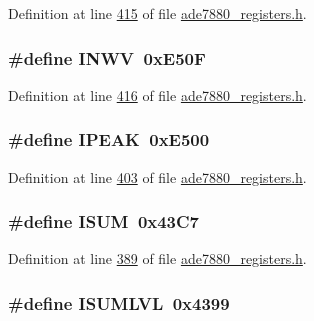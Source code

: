 Definition at line \hyperlink{a00036_source_l00415}{415} of file \hyperlink{a00036_source}{ade7880\-\_\-registers.\-h}.

\hypertarget{a00036_a55555ccc816198768fe973de5ca2b185}{
\subsubsection[{I\-N\-W\-V}]{\setlength{\rightskip}{0pt plus 5cm}\#define I\-N\-W\-V~0x\-E50\-F}}\label{de/d8c/a00036_a55555ccc816198768fe973de5ca2b185}


Definition at line \hyperlink{a00036_source_l00416}{416} of file \hyperlink{a00036_source}{ade7880\-\_\-registers.\-h}.

\hypertarget{a00036_a5ddcbc71d03e9945b4f454d59bb76140}{
\subsubsection[{I\-P\-E\-A\-K}]{\setlength{\rightskip}{0pt plus 5cm}\#define I\-P\-E\-A\-K~0x\-E500}}\label{de/d8c/a00036_a5ddcbc71d03e9945b4f454d59bb76140}


Definition at line \hyperlink{a00036_source_l00403}{403} of file \hyperlink{a00036_source}{ade7880\-\_\-registers.\-h}.

\hypertarget{a00036_ac84c4287f80dc29bdec129d9058180a8}{
\subsubsection[{I\-S\-U\-M}]{\setlength{\rightskip}{0pt plus 5cm}\#define I\-S\-U\-M~0x43\-C7}}\label{de/d8c/a00036_ac84c4287f80dc29bdec129d9058180a8}


Definition at line \hyperlink{a00036_source_l00389}{389} of file \hyperlink{a00036_source}{ade7880\-\_\-registers.\-h}.

\hypertarget{a00036_a0215d6d8187642f8789c19422210c3eb}{
\subsubsection[{I\-S\-U\-M\-L\-V\-L}]{\setlength{\rightskip}{0pt plus 5cm}\#define I\-S\-U\-M\-L\-V\-L~0x4399}}\label{de/d8c/a00036_a0215d6d8187642f8789c19422210c3eb}


